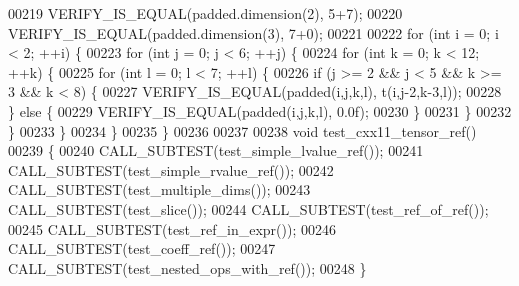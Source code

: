 \begin{DoxyCode}
00219   VERIFY\_IS\_EQUAL(padded.dimension(2), 5+7);
00220   VERIFY\_IS\_EQUAL(padded.dimension(3), 7+0);
00221 
00222   \textcolor{keywordflow}{for} (\textcolor{keywordtype}{int} i = 0; i < 2; ++i) \{
00223     \textcolor{keywordflow}{for} (\textcolor{keywordtype}{int} j = 0; j < 6; ++j) \{
00224       \textcolor{keywordflow}{for} (\textcolor{keywordtype}{int} k = 0; k < 12; ++k) \{
00225         \textcolor{keywordflow}{for} (\textcolor{keywordtype}{int} l = 0; l < 7; ++l) \{
00226           \textcolor{keywordflow}{if} (j >= 2 && j < 5 && k >= 3 && k < 8) \{
00227             VERIFY\_IS\_EQUAL(padded(i,j,k,l), t(i,j-2,k-3,l));
00228           \} \textcolor{keywordflow}{else} \{
00229             VERIFY\_IS\_EQUAL(padded(i,j,k,l), 0.0f);
00230           \}
00231         \}
00232       \}
00233     \}
00234   \}
00235 \}
00236 
00237 
00238 \textcolor{keywordtype}{void} test\_cxx11\_tensor\_ref()
00239 \{
00240   CALL\_SUBTEST(test\_simple\_lvalue\_ref());
00241   CALL\_SUBTEST(test\_simple\_rvalue\_ref());
00242   CALL\_SUBTEST(test\_multiple\_dims());
00243   CALL\_SUBTEST(test\_slice());
00244   CALL\_SUBTEST(test\_ref\_of\_ref());
00245   CALL\_SUBTEST(test\_ref\_in\_expr());
00246   CALL\_SUBTEST(test\_coeff\_ref());
00247   CALL\_SUBTEST(test\_nested\_ops\_with\_ref());
00248 \}
\end{DoxyCode}
